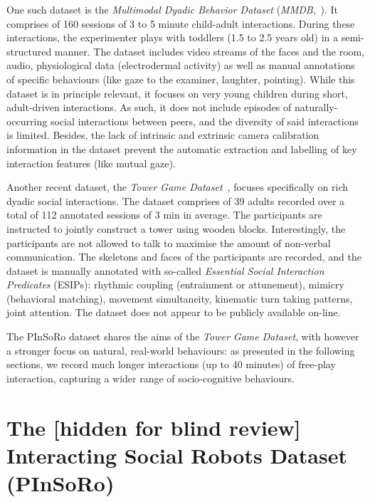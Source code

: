 \documentclass{article}
\begin{document}
One such dataset is the \emph{Multimodal Dyadic Behavior Dataset}
(\emph{MMDB},~\cite{rehg2013decoding}). It comprises of 160 sessions of 3 to 5
minute child-adult interactions. During these interactions, the experimenter
plays with toddlers (1.5 to 2.5 years old) in a semi-structured manner.  The dataset
includes video streams of the faces and the room, audio, physiological data
(electrodermal activity) as well as manual annotations of specific behaviours
(like gaze to the examiner, laughter, pointing). While this dataset is in
principle relevant, it focuses on very young children during short, adult-driven
interactions. As such, it does not include episodes of naturally-occurring
social interactions between peers, and the diversity of said interactions is
limited. Besides, the lack of intrinsic and extrinsic camera calibration
information in the dataset prevent the automatic extraction and labelling of key
interaction features (like mutual gaze).

Another recent dataset, the \emph{Tower Game Dataset}~\cite{salter2015tower},
focuses specifically on rich dyadic social interactions. The dataset comprises
of 39 adults recorded over a total of 112 annotated sessions of 3 min in
average. The participants are instructed to jointly construct a tower using wooden
blocks. Interestingly, the participants are not allowed to talk to
maximise the amount of non-verbal communication. The skeletons and faces of the
participants are recorded, and the dataset is manually annotated with so-called
\emph{Essential Social Interaction Predicates} (ESIPs): rhythmic coupling
(entrainment or attunement), mimicry (behavioral matching), movement
simultaneity, kinematic turn taking patterns, joint attention. The dataset does
not appear to be publicly available on-line.

The PInSoRo dataset shares the aims of the \emph{Tower Game Dataset}, with
however a stronger focus on natural, real-world behaviours: as presented in the
following sections, we record much longer interactions (up to 40 minutes) of
free-play interaction, capturing a wider range of socio-cognitive behaviours.

\section{The [hidden for blind review] Interacting Social Robots Dataset (PInSoRo)}
\end{document}

